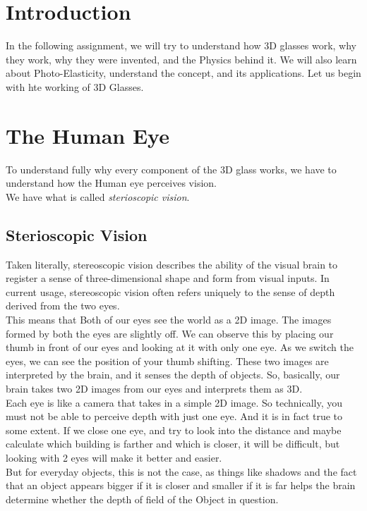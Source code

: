 \documentclass[11pt]{article}
\begin{document}
\tableofcontents
\clearpage

\section{Introduction}
In the following assignment, we will try to understand how 3D glasses work, why they work, why they were invented, and the Physics behind it. We will also learn about Photo-Elasticity, understand the concept, and its applications. Let us begin with hte working of 3D Glasses. 

\section{The Human Eye}
To understand fully why every component of the 3D glass works, we have to understand how the Human eye perceives vision. \\
We have what is called \textit{sterioscopic vision}.
\subsection{Sterioscopic Vision}
Taken literally, stereoscopic vision describes the ability of the visual brain to register a sense of three-dimensional shape and form from visual inputs. In current usage, stereoscopic vision often refers uniquely to the sense of depth derived from the two eyes.\\

This means that Both of our eyes see the world as a 2D image. The images formed by both the eyes are slightly off. We can observe this by placing our thumb in front of our eyes and looking at it with only one eye. As we switch the eyes, we can see the position of your thumb shifting. These two images are interpreted by the brain, and it senses the depth of objects. So, basically, our brain takes two 2D images from our eyes and interprets them as 3D.\\

Each eye is like a camera that takes in a simple 2D image. So technically, you must not be able to perceive depth with just one eye. And it is in fact true to some extent. If we close one eye, and try to look into the distance and maybe calculate which building is farther and which is closer, it will be difficult, but looking with 2 eyes will make it better and easier. \\

But for everyday objects, this is not the case, as things like shadows and the fact that an object appears bigger if it is closer and smaller if it is far helps the brain determine whether the depth of field of the Object in question. \\
\end{document}
